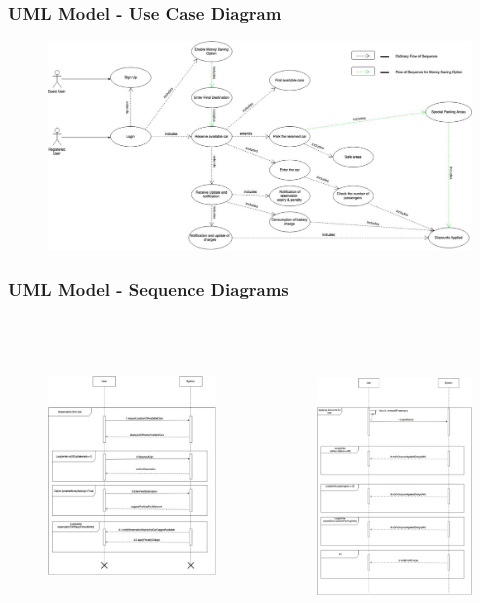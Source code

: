 \begin{frame}
	\frametitle{UML Model - Use Case Diagram}
	\begin{figure}[H]
		\centering
		\includegraphics[width=\linewidth,keepaspectratio]{figures/use_case_diagram.eps}
		\label{fig:use_case_diagram}
	\end{figure}
\end{frame}

\begin{frame}
	\frametitle{UML Model - Sequence Diagrams}
	\begin{columns}[c]
		\begin{figure}[H]
			\centering
			\includegraphics[height=6.9cm,keepaspectratio]{figures/sequence_reservation.eps}
			\label{fig:sequence_reservation}
		\end{figure}
		\begin{figure}[H]
			\centering
			\includegraphics[height=7.5cm,keepaspectratio]{figures/sequence_discounts.eps}
			\label{fig:sequence_discounts}
		\end{figure}
	\end{columns}
\end{frame}

